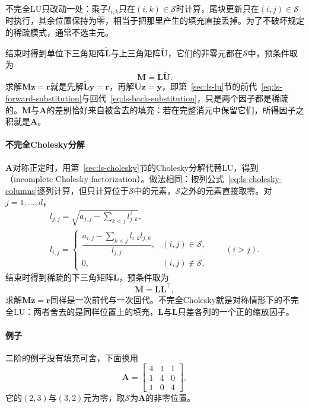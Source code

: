 不完全LU只改动一处：乘子$l_{i,k}$只在$(i,k)\in\mathcal S$时计算，尾块更新只在$(i,j)\in\mathcal S$时执行，其余位置保持为零，相当于把那里产生的填充直接丢掉。为了不破坏规定的稀疏模式，通常不选主元。

结束时得到单位下三角矩阵$\widetilde{\bm L}$与上三角矩阵$\widetilde{\bm U}$，它们的非零元都在$\mathcal S$中，预条件取为
\begin{equation}
 \bm M=\widetilde{\bm L}\widetilde{\bm U} .
 \label{eq:ls-ilu-preconditioner}
\end{equation}
求解$\bm M\bm z=\bm r$就是先解$\widetilde{\bm L}\bm y=\bm r$，再解$\widetilde{\bm U}\bm z=\bm y$，即第~\ref{sec:ls-lu}节的前代~\eqref{eq:ls-forward-substitution}与回代~\eqref{eq:ls-back-substitution}，只是两个因子都是稀疏的。$\bm M$与$\bm A$的差别恰好来自被舍去的填充：若在完整消元中保留它们，所得因子之积就是$\bm A$。

\paragraph{不完全Cholesky分解}
$\bm A$对称正定时，用第~\ref{sec:ls-cholesky}节的Cholesky分解代替LU，得到（incomplete Cholesky factorization）。做法相同：按列公式~\eqref{eq:ls-cholesky-columns}逐列计算，但只计算位于$\mathcal S$中的元素，$\mathcal S$之外的元素直接取零。对$j=1,\ldots,d$，
\begin{equation}
 \begin{gathered}
 l_{j,j}=\sqrt{a_{j,j}-\sum_{k<j}l_{j,k}^2},\\
 l_{i,j}=\begin{cases}\dfrac{a_{i,j}-\sum_{k<j}l_{i,k}l_{j,k}}{l_{j,j}},&(i,j)\in\mathcal S,\\[1ex] 0,&(i,j)\notin\mathcal S,\end{cases}\qquad(i>j).
 \end{gathered}
 \label{eq:ls-incomplete-cholesky}
\end{equation}
结束时得到稀疏的下三角矩阵$\bm L$，预条件取为
\begin{equation}
 \bm M=\bm L\bm L^\top ,
 \label{eq:ls-ic-preconditioner}
\end{equation}
求解$\bm M\bm z=\bm r$同样是一次前代与一次回代。不完全Cholesky就是对称情形下的不完全LU：两者舍去的是同样位置上的填充，$\bm L$与$\widetilde{\bm L}$只差各列的一个正的缩放因子。

\paragraph{例子}
二阶的例子没有填充可舍，下面换用
\[
 \bm A=\begin{bmatrix}4&1&1\\1&4&0\\1&0&4\end{bmatrix},
\]
它的$(2,3)$与$(3,2)$元为零，取$\mathcal S$为$\bm A$的非零位置。

